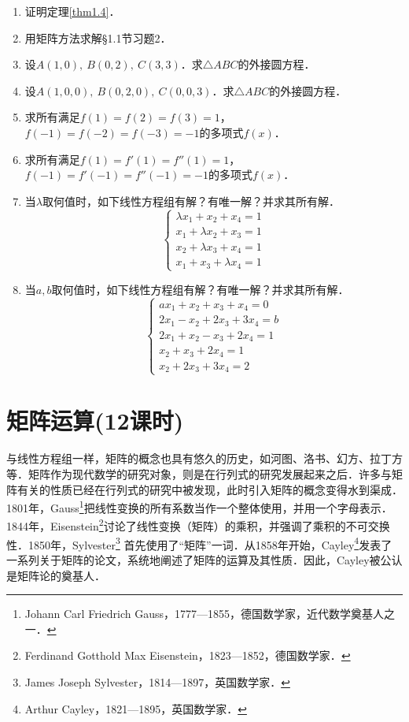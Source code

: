 \documentclass[a4paper,fontset=windows]{ctexbook}
\theoremstyle{definition}
\begin{document}
\begin{enumerate}
\item 证明定理\ref{thm1.4}．

\item 用矩阵方法求解\S 1.1节习题2．

\item 设$A(1,0),~B(0,2),~C(3,3)$．求$\triangle ABC$的外接圆方程．

\item 设$A(1,0,0),~B(0,2,0),~C(0,0,3)$．求$\triangle ABC$的外接圆方程．

\item 求所有满足$f(1)=f(2)=f(3)=1$，$f(-1)=f(-2)=f(-3)=-1$的多项式$f(x)$．

\item 求所有满足$f(1)=f'(1)=f''(1)=1$，$f(-1)=f'(-1)=f''(-1)=-1$的多项式$f(x)$．

\item 当$\lambda$取何值时，如下线性方程组有解？有唯一解？并求其所有解．
$$\begin{cases}
\lambda x_1+x_2+x_4=1 \\
x_1+\lambda x_2+x_3=1 \\
x_2+\lambda x_3+x_4=1 \\
x_1+x_3+\lambda x_4=1
\end{cases}$$

\item 当$a,b$取何值时，如下线性方程组有解？有唯一解？并求其所有解．
$$\begin{cases}
ax_1+x_2+x_3+x_4=0 \\
2x_1-x_2+2x_3+3x_4=b \\
2x_1+x_2-x_3+2x_4=1 \\
x_2+x_3+2x_4=1 \\
x_2+2x_3+3x_4=2
\end{cases}$$
\end{enumerate}

\chapter{矩阵运算(12课时)}%

与线性方程组一样，矩阵的概念也具有悠久的历史，如河图、洛书、幻方、拉丁方等．矩阵作为现代数学的研究对象，则是在行列式的研究发展起来之后．许多与矩阵有关的性质已经在行列式的研究中被发现，此时引入矩阵的概念变得水到渠成．1801年，Gauss\footnote{Johann Carl Friedrich Gauss，1777—1855，德国数学家，近代数学奠基人之一．}把线性变换的所有系数当作一个整体使用，并用一个字母表示．1844年，Eisenstein\footnote{Ferdinand Gotthold Max Eisenstein，1823—1852，德国数学家．}讨论了线性变换（矩阵）的乘积，并强调了乘积的不可交换性．1850年，Sylvester\footnote{James Joseph Sylvester，1814—1897，英国数学家．} 首先使用了“矩阵”一词．从1858年开始，Cayley\footnote{Arthur Cayley，1821—1895，英国数学家．}发表了一系列关于矩阵的论文，系统地阐述了矩阵的运算及其性质．因此，Cayley被公认是矩阵论的奠基人．
\end{document}
